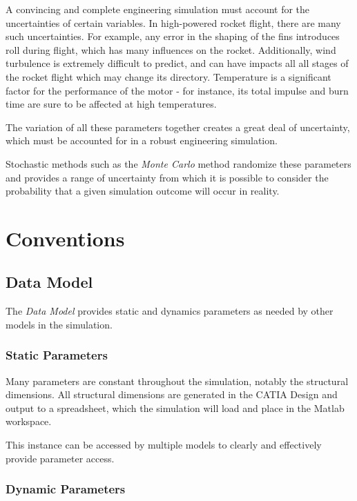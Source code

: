 \documentclass[]{article}
\begin{document}
A convincing and complete engineering simulation must account for the
uncertainties of certain variables. In high-powered rocket flight, there
are many such uncertainties. For example, any error in the shaping of
the fins introduces roll during flight, which has many influences on the
rocket. Additionally, wind turbulence is extremely difficult to predict,
and can have impacts all all stages of the rocket flight which may
change its directory. Temperature is a significant factor for the
performance of the motor - for instance, its total impulse and burn time
are sure to be affected at high temperatures.

The variation of all these parameters together creates a great deal of
uncertainty, which must be accounted for in a robust engineering
simulation.

Stochastic methods such as the \emph{Monte Carlo} method randomize these
parameters and provides a range of uncertainty from which it is possible
to consider the probability that a given simulation outcome will occur
in reality.

\section{Conventions}\label{conventions}

\subsection{Data Model}\label{data-model}

The \emph{Data Model} provides static and dynamics parameters as needed
by other models in the simulation.

\subsubsection{Static Parameters}\label{static-parameters-1}

Many parameters are constant throughout the simulation, notably the
structural dimensions. All structural dimensions are generated in the
CATIA Design and output to a spreadsheet, which the simulation will load
and place in the Matlab workspace.

This instance can be accessed by multiple models to clearly and
effectively provide parameter access.

\subsubsection{Dynamic Parameters}\label{dynamic-parameters-1}
\end{document}

